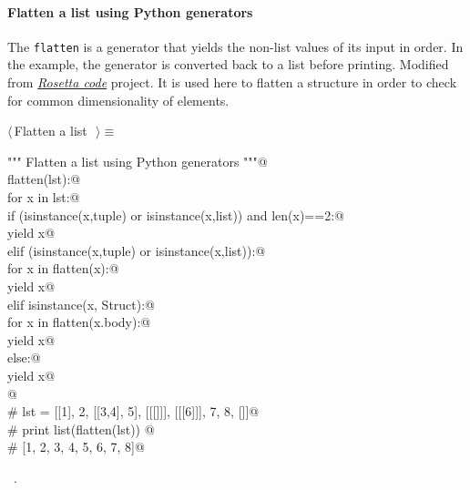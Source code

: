 \documentclass[11pt,oneside]{article}	%
\begin{document}

\paragraph{Flatten a list using Python generators}
The \texttt{flatten} is a generator that yields the non-list values of its input in order. In the example, the generator is converted back to a list before printing. Modified from \href{http://rosettacode.org/wiki/Flatten_a_list#Python}{\emph{Rosetta code}} project. It is used here to flatten a structure in order to check for common dimensionality of elements.

\begin{flushleft} \small \label{scrap35}
$\langle\,$Flatten a list\nobreak\ {\footnotesize {}}$\,\rangle\equiv$
\vspace{-1ex}
\begin{list}{}{} \item
\mbox{}\verb@""" Flatten a list using Python generators """@\\
\mbox{}\verb@def flatten(lst):@\\
\mbox{}\verb@   for x in lst:@\\
\mbox{}\verb@      if (isinstance(x,tuple) or isinstance(x,list)) and len(x)==2:@\\
\mbox{}\verb@         yield x@\\
\mbox{}\verb@      elif (isinstance(x,tuple) or isinstance(x,list)):@\\
\mbox{}\verb@         for x in flatten(x):@\\
\mbox{}\verb@            yield x@\\
\mbox{}\verb@      elif isinstance(x, Struct):@\\
\mbox{}\verb@         for x in flatten(x.body):@\\
\mbox{}\verb@            yield x@\\
\mbox{}\verb@      else:@\\
\mbox{}\verb@         yield x@\\
\mbox{}\verb@ @\\
\mbox{}\verb@# lst = [[1], 2, [[3,4], 5], [[[]]], [[[6]]], 7, 8, []]@\\
\mbox{}\verb@# print list(flatten(lst)) @\\
\mbox{}\verb@# [1, 2, 3, 4, 5, 6, 7, 8]@\\
\mbox{}\verb@@{\NWsep}
\end{list}
\vspace{-1ex}
\footnotesize\addtolength{\baselineskip}{-1ex}
\begin{list}{}{\setlength{\itemsep}{-\parsep}\setlength{\itemindent}{-\leftmargin}}
\item \NWtxtMacroRefIn\ .
\end{list}
\end{flushleft}
\end{document}
